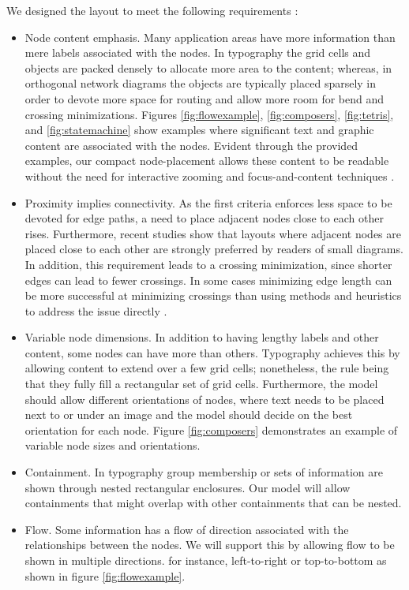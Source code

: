 \documentclass[a4paper,11pt,phdthesis,singlespace,twoside]{cssethesis}
\begin{document}
We designed the layout to meet the following requirements \cite{Yoghourdjian2015high}:

\begin{itemize}
\item Node content emphasis. Many application areas have more information than mere labels associated with the nodes. In typography the grid cells and objects are packed densely to allocate more area to the content; whereas, in orthogonal network diagrams the objects are typically placed sparsely in order to devote more space for routing and allow more room for bend and crossing minimizations. Figures \ref{fig:flowexample}, \ref{fig:composers}, \ref{fig:tetris}, and \ref{fig:statemachine} show examples where significant text and graphic content are associated with the nodes. Evident through the provided examples, our compact node-placement allows these content to be readable without the need for interactive zooming and focus-and-content techniques \cite{harel1995randomized}. 

\item Proximity implies connectivity. As the first criteria enforces less space to be devoted for edge paths, a need to place adjacent nodes close to each other rises. Furthermore, recent studies \cite{dwyer2006ipsep} show that layouts where adjacent nodes are placed close to each other are strongly preferred by readers of small diagrams. In addition, this requirement leads to a crossing minimization, since shorter edges can lead to fewer crossings. In some cases minimizing edge length can be more successful at minimizing crossings than using methods and heuristics to address the issue directly \cite{dwyer2013edge}.

\item Variable node dimensions. In addition to having lengthy labels and other content, some nodes can have more than others. Typography achieves this by allowing content to extend over a few grid cells; nonetheless, the rule being that they fully fill a rectangular set of grid cells. Furthermore, the model should allow different orientations of nodes, where text needs to be placed next to or under an image and the model should decide on the best orientation for each node. Figure \ref{fig:composers} demonstrates an example of variable node sizes and orientations.

\item Containment. In typography group membership or sets of information are shown through nested rectangular enclosures. Our model will allow containments that might overlap with other containments that can be nested.

\item Flow. Some information has a flow of direction associated with the relationships between the nodes. We will support this by allowing flow to be shown in multiple directions. for instance, left-to-right or top-to-bottom as shown in figure \ref{fig:flowexample}.

\end{itemize}
\end{document}
